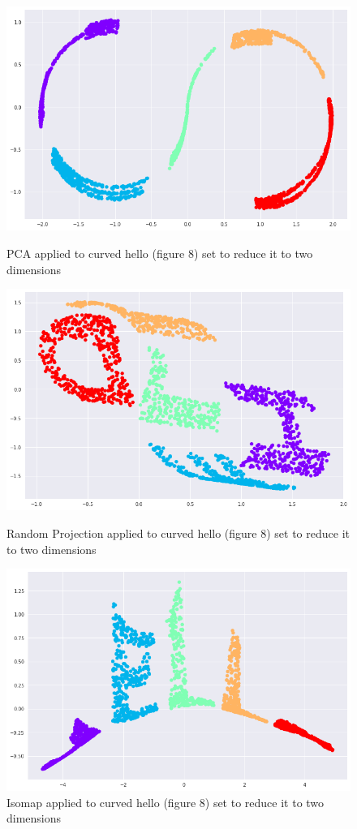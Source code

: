 \documentclass[a4paper]{article}
\begin{document}
\begin{figure}[H]
\centering
\includegraphics[scale = 0.32]{pca_part2.png}
\caption{\label{fig:pca_part2}PCA applied to curved hello (figure 8) set to reduce it to two dimensions}
\includegraphics[scale = 0.32]{random_projection_part2.png}
\caption{\label{fig:random_projection_part2}Random Projection applied to curved hello (figure 8) set to reduce it to two dimensions}
\includegraphics[scale = 0.32]{isomap_part2.png}
\caption{\label{fig:isomap_part2}Isomap applied to curved hello (figure 8) set to reduce it to two dimensions}

\end{figure}
\end{document}
